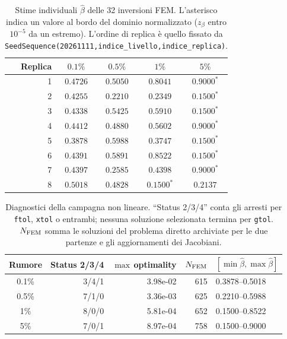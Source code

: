 \begin{table}[!htbp]
\centering\small
\caption{Stime individuali $\widehat\beta$ delle 32 inversioni FEM. L'asterisco indica un valore al bordo del dominio normalizzato ($z_\beta$ entro $10^{-5}$ da un estremo). L'ordine di replica è quello fissato da \texttt{SeedSequence(20261111,indice\_livello,indice\_replica)}.}
\label{tab:app-fem-cases}
\setlength{\tabcolsep}{11pt}
\begin{tabular}{@{}rcccc@{}}
\toprule
Replica & $0.1\%$ & $0.5\%$ & $1\%$ & $5\%$ \\
\midrule
1 & $0.4726$ & $0.5050$ & $0.8041$ & $0.9000^{\ast}$ \\
2 & $0.4255$ & $0.2210$ & $0.2349$ & $0.1500^{\ast}$ \\
3 & $0.4338$ & $0.5425$ & $0.5910$ & $0.1500^{\ast}$ \\
4 & $0.4412$ & $0.4880$ & $0.5602$ & $0.9000^{\ast}$ \\
5 & $0.3878$ & $0.5988$ & $0.3747$ & $0.1500^{\ast}$ \\
6 & $0.4391$ & $0.5891$ & $0.8522$ & $0.1500^{\ast}$ \\
7 & $0.4397$ & $0.2585$ & $0.4398$ & $0.9000^{\ast}$ \\
8 & $0.5018$ & $0.4828$ & $0.1500^{\ast}$ & $0.2137$ \\
\bottomrule
\end{tabular}
\end{table}

\begin{table}[!htbp]
\centering\small
\caption{Diagnostici della campagna non lineare. ``Status 2/3/4'' conta gli arresti per \texttt{ftol}, \texttt{xtol} o entrambi; nessuna soluzione selezionata termina per \texttt{gtol}. $N_{\rm FEM}$ somma le soluzioni del problema diretto archiviate per le due partenze e gli aggiornamenti dei Jacobiani.}
\label{tab:app-fem-diagnostics}
\setlength{\tabcolsep}{7pt}
\begin{tabular}{@{}crrrl@{}}
\toprule
Rumore & Status 2/3/4 & $\max\,$optimality & $N_{\rm FEM}$ & $[\min\widehat\beta,\max\widehat\beta]$ \\
\midrule
0.1\% & 3/4/1 & 3.98e-02 & 615 & 0.3878--0.5018 \\
0.5\% & 7/1/0 & 3.36e-03 & 625 & 0.2210--0.5988 \\
1\% & 8/0/0 & 5.81e-04 & 652 & 0.1500--0.8522 \\
5\% & 7/0/1 & 8.97e-04 & 758 & 0.1500--0.9000 \\
\bottomrule
\end{tabular}
\end{table}

